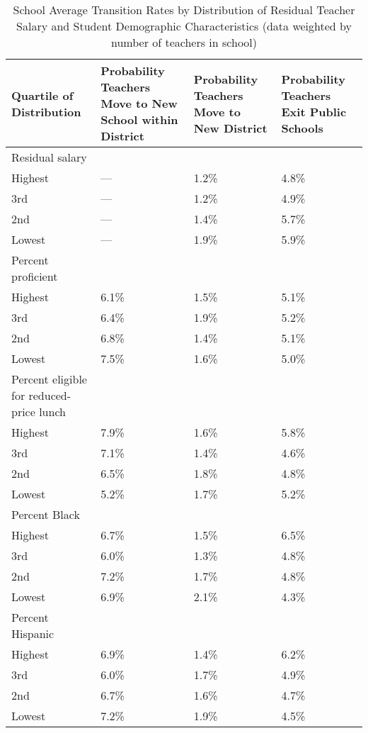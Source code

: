 \documentclass[]{article}
\begin{document}
\begin{table}[htbp]
\centering
\begin{tabular}{p{}p{}p{}p{}}
  \hline
Quartile of Distribution & Probability Teachers Move to New School within District & Probability Teachers Move to New District & Probability Teachers Exit Public Schools \\ 
  \hline
Residual salary & & & \\
\quad Highest & --- & 1.2\% & 4.8\% \\ 
  \quad 3rd & --- & 1.2\% & 4.9\% \\ 
  \quad 2nd & --- & 1.4\% & 5.7\% \\ 
  \quad Lowest & --- & 1.9\% & 5.9\% \\ 
Percent proficient & & & \\
  \quad Highest & 6.1\% & 1.5\% & 5.1\% \\ 
  \quad 3rd & 6.4\% & 1.9\% & 5.2\% \\ 
  \quad 2nd & 6.8\% & 1.4\% & 5.1\% \\ 
  \quad Lowest & 7.5\% & 1.6\% & 5.0\% \\ 
Percent eligible for reduced-price lunch & & & \\
  \quad Highest & 7.9\% & 1.6\% & 5.8\% \\ 
  \quad 3rd & 7.1\% & 1.4\% & 4.6\% \\ 
  \quad 2nd & 6.5\% & 1.8\% & 4.8\% \\ 
  \quad Lowest & 5.2\% & 1.7\% & 5.2\% \\ 
Percent Black & & & \\
  \quad Highest & 6.7\% & 1.5\% & 6.5\% \\ 
  \quad 3rd & 6.0\% & 1.3\% & 4.8\% \\ 
  \quad 2nd & 7.2\% & 1.7\% & 4.8\% \\ 
  \quad Lowest & 6.9\% & 2.1\% & 4.3\% \\ 
Percent Hispanic & & & \\
  \quad Highest & 6.9\% & 1.4\% & 6.2\% \\ 
  \quad 3rd & 6.0\% & 1.7\% & 4.9\% \\ 
  \quad 2nd & 6.7\% & 1.6\% & 4.7\% \\ 
  \quad Lowest & 7.2\% & 1.9\% & 4.5\% \\ 
   \hline
\end{tabular}
\caption{School Average Transition Rates by Distribution of Residual Teacher Salary and Student Demographic Characteristics (data weighted by number of teachers in school)} 
\label{tbl:change_by_quartile}
\end{table}
\end{document}
